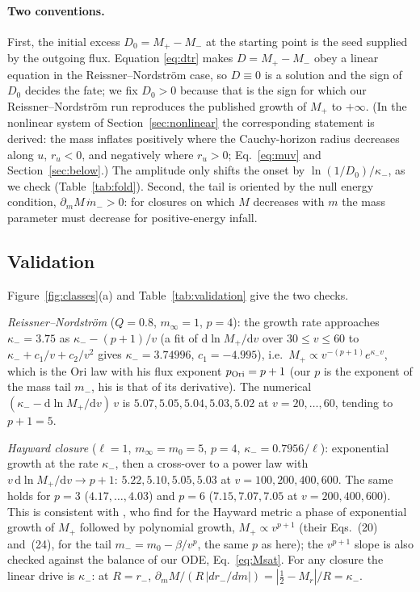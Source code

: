\documentclass[11pt]{article}
\newcommand{\dd}{\mathrm{d}}
\begin{document}
\paragraph{Two conventions.} First, the initial excess $D_0=M_+-M_-$ at the starting point is the seed supplied by the outgoing flux. Equation \eqref{eq:dtr} makes $D=M_+-M_-$ obey a linear equation in the Reissner--Nordstr\"om case, so $D\equiv0$ is a solution and the sign of $D_0$ decides the fate; we fix $D_0>0$ because that is the sign for which our Reissner--Nordstr\"om run reproduces the published growth of $M_+$ to $+\infty$. (In the nonlinear system of Section~\ref{sec:nonlinear} the corresponding statement is derived: the mass inflates positively where the Cauchy-horizon radius decreases along $u$, $r_u<0$, and negatively where $r_u>0$; Eq.~\eqref{eq:muv} and Section~\ref{sec:below}.) The amplitude only shifts the onset by $\ln(1/D_0)/\kappa_-$, as we check (Table~\ref{tab:fold}). Second, the tail is oriented by the null energy condition, $\partial_mM\,\dot m_->0$: for closures on which $M$ decreases with $m$ the mass parameter must decrease for positive-energy infall.

\subsection{Validation}

Figure~\ref{fig:classes}(a) and Table~\ref{tab:validation} give the two checks.

\emph{Reissner--Nordstr\"om} ($Q=0.8$, $m_\infty=1$, $p=4$): the growth rate approaches $\kappa_-=3.75$ as $\kappa_--(p+1)/v$ (a fit of $\dd\ln M_+/\dd v$ over $30\le v\le60$ to $\kappa_-+c_1/v+c_2/v^2$ gives $\kappa_-=3.74996$, $c_1=-4.995$), i.e.\ $M_+\propto v^{-(p+1)}e^{\kappa_-v}$, which is the Ori law with his flux exponent $p_{\rm Ori}=p+1$ (our $p$ is the exponent of the mass tail $m_-$, his is that of its derivative). The numerical $(\kappa_--\dd\ln M_+/\dd v)\,v$ is $5.07,5.05,5.04,5.03,5.02$ at $v=20,\dots,60$, tending to $p+1=5$.

\emph{Hayward closure} ($\ell=1$, $m_\infty=m_0=5$, $p=4$, $\kappa_-=0.7956/\ell$): exponential growth at the rate $\kappa_-$, then a cross-over to a power law with $v\,\dd\ln M_+/\dd v\to p+1$: $5.22,5.10,5.05,5.03$ at $v=100,200,400,600$. The same holds for $p=3$ ($4.17,\dots,4.03$) and $p=6$ ($7.15,7.07,7.05$ at $v=200,400,600$). This is consistent with \citet{CarballoRubio2021}, who find for the Hayward metric a phase of exponential growth of $M_+$ followed by polynomial growth, $M_+\propto v^{p+1}$ (their Eqs.~(20) and~(24), for the tail $m_-=m_0-\beta/v^{p}$, the same $p$ as here); the $v^{p+1}$ slope is also checked against the balance of our ODE, Eq.~\eqref{eq:Msat}. For any closure the linear drive is $\kappa_-$: at $R=r_-$, $\partial_mM/(R\,|dr_-/dm|)=|\tfrac12-M_r|/R=\kappa_-$.
\end{document}
